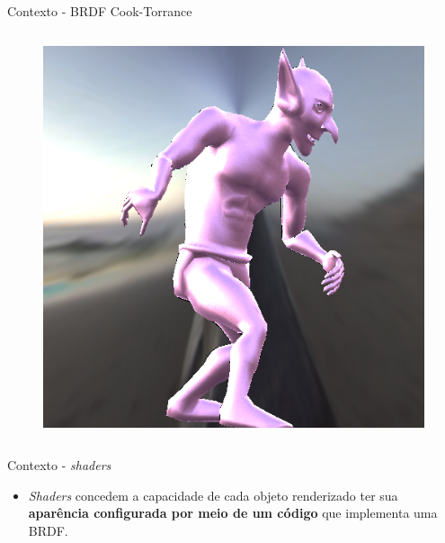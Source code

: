\begin{frame}{Contexto - BRDF Cook-Torrance}
\begin{columns}
\begin{figure}[H]
            
            \includegraphics[height=0.32\textheight]{./Imagens/brdfs/cook-torrance-alternative-goblin.png}
            
        \end{figure}
    \end{columns}
\end{frame}


\begin{frame}{Contexto - \textit{shaders}}
\begin{itemize}
\item \textit{Shaders} concedem a capacidade de cada objeto renderizado ter sua \textbf{aparência configurada por meio de um código} que implementa uma BRDF.
\end{itemize}

\end{frame}

